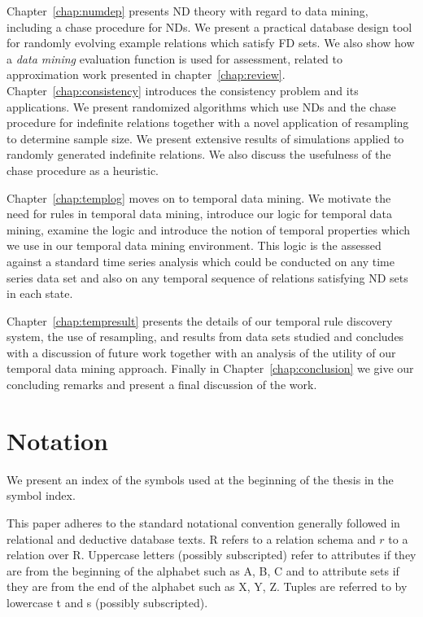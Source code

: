 \medskip

Chapter~\ref{chap:numdep} presents ND theory with regard to data
mining, including a chase procedure for NDs. We present a practical database design tool for randomly
evolving example relations which satisfy FD sets. We also show how a
{\em data mining} evaluation function is used for assessment, related
to approximation work presented in
chapter~\ref{chap:review}. Chapter~\ref{chap:consistency} introduces
the consistency problem and its applications. We present randomized
algorithms which use NDs and the chase procedure for indefinite
relations together with a novel application of resampling to determine
sample size. We present extensive results of simulations applied to
randomly generated indefinite relations. We also discuss the
usefulness of the chase procedure as a heuristic.

\medskip

Chapter~\ref{chap:templog} moves on to temporal data mining. We
motivate the need for rules in temporal data mining, introduce our
logic for temporal data mining, examine the logic and introduce the
notion of temporal properties which we use in our temporal data mining
environment. This logic is the assessed against a standard time series
analysis which could be conducted on any time series data set and also
on any temporal sequence of relations satisfying ND sets in each
state.

\medskip

Chapter~\ref{chap:tempresult} presents the details of our temporal
rule discovery system, the use of resampling, and results from data
sets studied and concludes with a discussion of future work together
with an analysis of the utility of our temporal data mining approach.
Finally in Chapter~\ref{chap:conclusion} we give our concluding
remarks and present a final discussion of the work.


\section{Notation}


We present an index of the symbols used at the beginning of the thesis
in the symbol index.

\smallskip

This paper adheres to the standard notational convention generally followed in
relational and deductive database texts.  R refers to a relation
schema and $r$ to a relation over R.  Uppercase letters (possibly
subscripted) refer to attributes if they are from the beginning of the
alphabet such as A, B, C and to attribute sets if they are from the
end of the alphabet such as X, Y, Z.  Tuples are referred to by
lowercase t and s (possibly subscripted).

